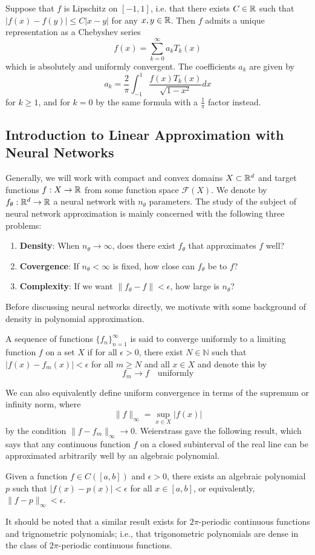 \begin{theorem} Suppose that $f$ is Lipschitz on $[-1,1]$, i.e. that there exists $C \in \mathbb{R}$ such that $|f(x) - f(y)| \leq C|x - y|$ for any $x, y \in \mathbb{R}$. Then $f$ admits a unique representation as a Chebyshev series
	\[ f(x) = \sum_{k=0}^\infty a_k T_k(x) \]
	which is absolutely and uniformly convergent. The coefficients $a_k$ are given by
	\[ a_k = \frac{2}{\pi} \int_{-1}^1 \frac{f(x)T_k(x)}{\sqrt{1-x^2}} dx \]
	for $k \geq 1$, and for $k=0$ by the same formula with a $\frac{1}{\pi}$ factor instead.
\end{theorem}

\subsection{Introduction to Linear Approximation with Neural Networks}
Generally, we will work with compact and convex domains $X \subset \mathbb{R}^d$ and target functions $f: X \rightarrow \mathbb{R}$ from some function space $\mathcal{F}(X)$. We denote by $f_\theta: \mathbb{R}^d \rightarrow \mathbb{R}$ a neural network with $n_\theta$ parameters. The study of the subject of neural network approximation is mainly concerned with the following three problems:
\begin{enumerate}
	\item \textbf{Density}: When $n_\theta \rightarrow \infty$, does there exist $f_\theta$ that approximates $f$ well?
	\item \textbf{Covergence}: If $n_\theta < \infty$ is fixed, how close can $f_\theta$ be to $f$?
	\item \textbf{Complexity}: If we want $\| f_\theta - f \| < \epsilon$, how large is $n_\theta$?
\end{enumerate}
Before discussing neural networks directly, we motivate with some background of density in polynomial approximation.
\begin{dfn}
	A sequence of functions $\{f_n\}_{n=1}^\infty$ is said to converge uniformly to a limiting function $f$ on a set $X$ if for all $\epsilon > 0$, there exist $N \in \mathbb{N}$ such that $|f(x) - f_m(x)| <\epsilon$ for all $m \geq N$ and all $x \in X$ and denote this by \[f_m \rightarrow f \quad \text{uniformly} \]
\end{dfn}
We can also equivalently define uniform convergence in terms of the supremum or infinity norm, where
\[ \| f\|_\infty = \sup_{x \in X}|f(x)| \]
by the condition $\| f - f_m \|_\infty \rightarrow 0$.
Weierstrass gave the following result, which says that any continuous function $f$ on a closed subinterval of the real line can be approximated arbitrarily well by an algebraic polynomial.
\begin{theorem}[Weierstrass]
  Given a function $f \in C([a, b])$ and $\epsilon > 0$, there exists an algebraic polynomial $p$ such that $|f(x) - p(x)| <\epsilon$ for all $x \in [a, b]$, or equivalently, $\| f - p \|_\infty < \epsilon$. 
  \label{thm: weierstrass}
\end{theorem}
It should be noted that a similar result exists for $2\pi$-periodic continuous functions and trignometric polynomials; i.e., that trigonometric polynomials are dense in the class of $2\pi$-periodic continuous functions.
